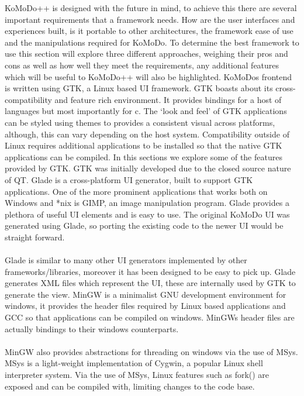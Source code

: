 \graphicspath{ {images/research/} }
%
KoMoDo++ is designed with the future in mind, to achieve this there are several important requirements that a framework needs. How are the user interfaces and experiences built, is it portable to other architectures, the framework ease of use and the manipulations required for KoMoDo. To determine the best framework to use this section will explore three different approaches, weighing their pros and cons as well as how well they meet the requirements, any additional features which will be useful to KoMoDo++ will also be highlighted.
%
KoMoDos frontend is written using GTK, a Linux based UI framework. GTK boasts about its cross-compatibility and feature rich environment. It provides bindings for a host of languages but most importantly for c. The  `look and feel' of GTK applications can be styled using themes to provides a consistent visual across platforms, although, this can vary depending on the host system. Compatibility outside of Linux requires additional applications to be installed so that the native GTK applications can be compiled. In this sections we explore some of the features provided by GTK. GTK was initially developed due to the closed source nature of QT.
  Glade is a cross-platform UI generator, built to support GTK applications. One of the more prominent applications that works both on Windows and *nix is GIMP, an image manipulation program. Glade provides a plethora of useful UI elements and is easy to use. The original KoMoDo UI was generated using Glade, so porting the existing code to the newer UI would be straight forward.\\\\
  Glade is similar to many other UI generators implemented by other frameworks/libraries, moreover it has been designed to be easy to pick up. Glade generates XML files which represent the UI, these are internally used by GTK to generate the view.
  MinGW is a minimalist GNU development environment for windows, it provides the header files required by Linux based applications and GCC so that applications can be compiled on windows. MinGWs header files are actually bindings to their windows counterparts.\\\\
  MinGW also provides abstractions for threading on windows via the use of MSys. MSys is a light-weight implementation of Cygwin, a popular Linux shell interpreter system. Via the use of MSys, Linux features such as fork() are exposed and can be compiled with, limiting changes to the code base.
